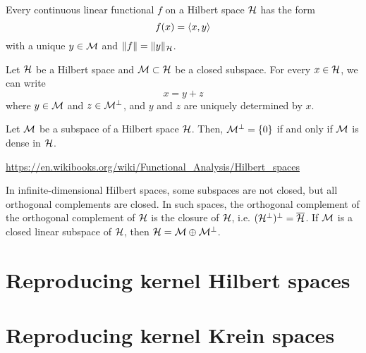 \documentclass[a4paper,showframe,11pt,draft]{report}
\begin{document}



\begin{theorem}
  Every continuous linear functional $f$ on a Hilbert space ${\mathcal H}$ has the form
  \[
    f(x) = \langle x,y\rangle
  \]
  with a unique $y \in {\mathcal M}$ and $\lVert f\rVert = \lVert y\rVert_{\mathcal H}$.
\end{theorem}

\begin{theorem}
  Let ${\mathcal H}$ be a Hilbert space and ${\mathcal M} \subset {\mathcal H}$ be a closed subspace.
  For every $x \in {\mathcal H}$, we can write
  \[
    x = y + z
  \]
  where $y \in {\mathcal M}$ and $z \in {\mathcal M}^\bot$, and $y$ and $z$ are uniquely determined by $x$.
\end{theorem}

\begin{corollary}
  Let ${\mathcal M}$ be a subspace of a Hilbert space ${\mathcal H}$. Then, ${\mathcal M}^\bot = \{0\}$ if and only if ${\mathcal M}$ is dense in ${\mathcal H}$.
\end{corollary}

\url{https://en.wikibooks.org/wiki/Functional_Analysis/Hilbert_spaces}

In infinite-dimensional Hilbert spaces, some subspaces are not closed, but all orthogonal complements are closed. 
In such spaces, the orthogonal complement of the orthogonal complement of ${\mathcal H}$ is the closure of ${\mathcal H}$, i.e. $({\mathcal H}^\bot)^\bot = \overline {{\mathcal H}}$.
If ${\mathcal M}$ is a closed linear subspace of ${\mathcal H}$, then ${\mathcal H} = {\mathcal M} \oplus {\mathcal M}^\bot$.

\section{Reproducing kernel Hilbert spaces}

\section{Reproducing kernel Krein spaces}

\end{document}
